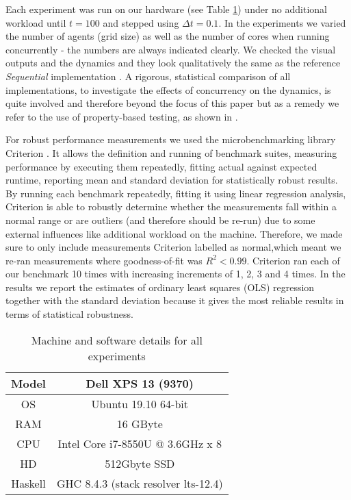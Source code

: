 Each experiment was run on our hardware (see Table \ref{tab:machine_specs}) under no additional workload until $t = 100$ and stepped using $\Delta t = 0.1$. In the experiments we varied the number of agents (grid size) as well as the number of cores when running concurrently - the numbers are always indicated clearly. We checked the visual outputs and the dynamics and they look qualitatively the same as the reference \textit{Sequential} implementation \cite{thaler_pure_2018}. A rigorous, statistical comparison of all implementations, to investigate the effects of concurrency on the dynamics, is quite involved and therefore beyond the focus of this paper but as a remedy we refer to the use of property-based testing, as shown in \cite{thaler_show_2019}.

For robust performance measurements we used the microbenchmarking library Criterion \cite{criterion_serpentine, criterion_hackage}. It allows the definition and running of benchmark suites, measuring performance by executing them repeatedly, fitting actual against expected runtime, reporting mean and standard deviation for statistically robust results. By running each benchmark repeatedly, fitting it using linear regression analysis, Criterion is able to robustly determine whether the measurements fall within a normal range or are outliers (and therefore should be re-run) due to some external influences like additional workload on the machine. Therefore, we made sure to only include measurements Criterion labelled as normal,which meant we re-ran measurements where goodness-of-fit was $R^2 < 0.99$. Criterion ran each of our benchmark 10 times with increasing increments of 1, 2, 3 and 4 times. In the results we report the estimates of ordinary least squares (OLS) regression together with the standard deviation because it gives the most reliable results in terms of statistical robustness. 


\begin{table}
	\centering
	\begin{tabular}{ c || c }
		Model   & Dell XPS 13 (9370)				    \\ \hline
		OS      & Ubuntu 19.10 64-bit 				\\ \hline
		RAM     & 16 GByte 							\\ \hline
		CPU     & Intel Core i7-8550U @ 3.6GHz x 8 	\\ \hline
		HD      & 512Gbyte SSD 						\\ \hline
		Haskell & GHC 8.4.3 (stack resolver lts-12.4)
	\end{tabular}
	
	\caption{Machine and software details for all experiments}
	\label{tab:machine_specs}
\end{table}

